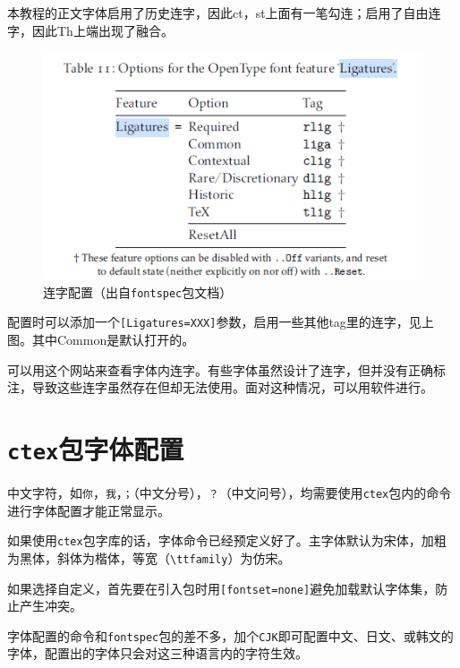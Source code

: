 \documentclass[10pt,openany]{book}
\begin{document}
本教程的正文字体启用了历史连字，因此ct，st上面有一笔勾连；启用了自由连字，因此Th上端出现了融合。

\begin{figure}[H]
    \centering
    \includegraphics[width=.7\linewidth]{data/ligatures.png}
    \caption{连字配置（出自\texttt{fontspec}包文档）}
\end{figure}

配置时可以添加一个\texttt{[Ligatures=XXX]}参数，启用一些其他tag里的连字，见上图。其中Common是默认打开的。

可以用这个网站来查看字体内连字。有些字体虽然设计了连字，但并没有正确标注，导致这些连字虽然存在但却无法使用。面对这种情况，可以用软件进行。

\section{\texttt{ctex}包字体配置}

中文字符，如\texttt{你}，\texttt{我}，\texttt{；}（中文分号），\texttt{？}（中文问号），均需要使用\texttt{ctex}包内的命令进行字体配置才能正常显示。

如果使用\texttt{ctex}包字库的话，字体命令已经预定义好了。主字体默认为宋体，加粗为黑体，斜体为楷体，等宽（\texttt{\textbackslash{}ttfamily}）为仿宋。



如果选择自定义，首先要在引入包时用\texttt{[fontset=none]}避免加载默认字体集，防止产生冲突。



字体配置的命令和\texttt{fontspec}包的差不多，加个\texttt{CJK}即可配置中文、日文、或韩文的字体，配置出的字体只会对这三种语言内的字符生效。
\end{document}
